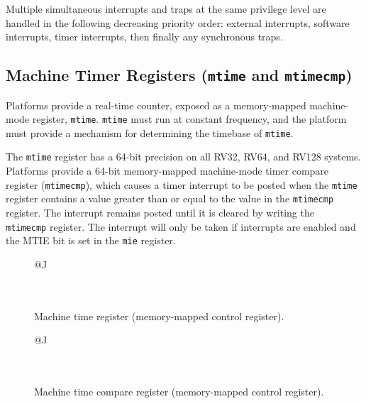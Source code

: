 Multiple simultaneous interrupts and traps at the same privilege level
are handled in the following decreasing priority order: external
interrupts, software interrupts, timer interrupts, then finally any
synchronous traps.

\subsection{Machine Timer Registers ({\tt mtime} and {\tt mtimecmp})}

Platforms provide a real-time counter, exposed as a memory-mapped
machine-mode register, {\tt mtime}.  {\tt mtime} must run at constant
frequency, and the platform must provide a mechanism for determining
the timebase of {\tt mtime}.

The {\tt mtime} register has a 64-bit precision on all RV32, RV64, and
RV128 systems.  Platforms provide a 64-bit memory-mapped machine-mode
timer compare register ({\tt mtimecmp}), which causes a timer
interrupt to be posted when the {\tt mtime} register contains a value
greater than or equal to the value in the {\tt mtimecmp} register.
The interrupt remains posted until it is cleared by writing the {\tt
  mtimecmp} register.  The interrupt will only be taken if interrupts
are enabled and the MTIE bit is set in the {\tt mie} register.

\begin{figure}[h!]
{\footnotesize
\begin{center}
\begin{tabular}{@{}J}
 \\
\hline
{} \\
 \\
\end{tabular}
\end{center}
}
\vspace{-0.1in}
\caption{Machine time register (memory-mapped control register).}
\end{figure}

\begin{figure}[h!]
{\footnotesize
\begin{center}
\begin{tabular}{@{}J}
 \\
\hline
{} \\
 \\
\end{tabular}
\end{center}
}
\vspace{-0.1in}
\caption{Machine time compare register (memory-mapped control register).}
\end{figure}

